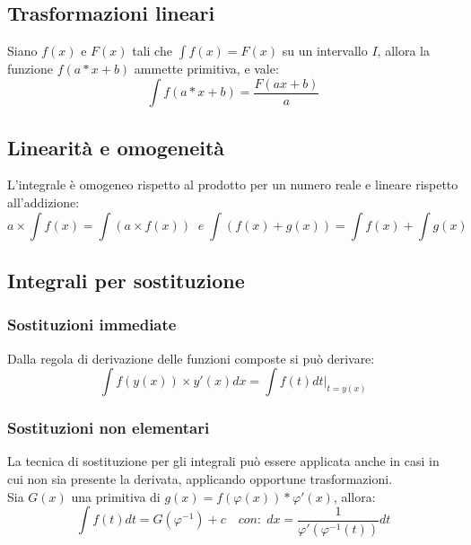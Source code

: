 \documentclass{article}
\begin{document}
\subsection{Trasformazioni lineari}
Siano $f(x)$ e $F(x)$ tali che $\int f(x)=F(x)$ su un intervallo $I$, allora la funzione $f(a*x+b)$ ammette primitiva, e vale: $$\int f(a*x+b)=\frac{F(ax+b)}{a}$$

\subsection{Linearità e omogeneità}
L'integrale è omogeneo rispetto al prodotto per un numero reale e lineare rispetto all'addizione:
$$a\times\int f(x)=\int( a\times f(x))\;\; e \;\int (f(x)+g(x))=\int f(x)+\int g(x)$$

\subsection{Integrali per sostituzione}

\subsubsection{Sostituzioni immediate}
Dalla regola di derivazione delle funzioni composte si può derivare:
$$\int f(y(x))\times y'(x)dx=\int f(t)dt|_{t=y(x)}$$

\subsubsection{Sostituzioni non elementari}
La tecnica di sostituzione per gli integrali può essere applicata anche in casi in cui non sia presente la derivata, applicando opportune trasformazioni.\\
Sia $G(x)$ una primitiva di $g(x)=f(\varphi(x))*\varphi'(x)$, allora: $$\int f(t)dt=G(\varphi^{-1})+c \quad con:\; dx = \frac{1}{\varphi'(\varphi^{-1}(t))}dt$$
\end{document}

